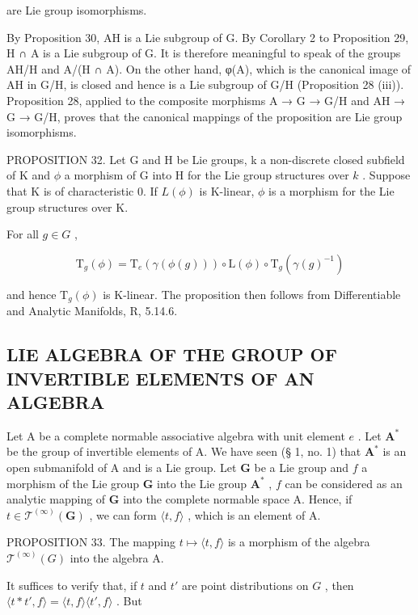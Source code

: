 are Lie group isomorphisms.

By Proposition 30, AH is a Lie subgroup of G. By Corollary 2 to Proposition 29, H ∩ A is a Lie subgroup of G. It is therefore meaningful to speak of the groups AH/H and A/(H ∩ A). On the other hand, φ(A), which is the canonical image of AH in G/H, is closed and hence is a Lie subgroup of G/H (Proposition 28 (iii)). Proposition 28, applied to the composite morphisms A → G → G/H and AH → G → G/H, proves that the canonical mappings of the proposition are Lie group isomorphisms.

PROPOSITION 32. Let G and H be Lie groups, k a non-discrete closed subfield of K and \(\phi\) a morphism of G into H for the Lie group structures over \(k\) . Suppose that K is of characteristic 0. If \(L(\phi)\) is K-linear, \(\phi\) is a morphism for the Lie group structures over K.

For all \(g \in G\) ,

\[
\mathrm{T} _ {g} (\phi) = \mathrm{T} _ {e} (\gamma (\phi (g))) \circ \mathrm{L} (\phi) \circ \mathrm{T} _ {g} (\gamma (g) ^ {- 1})
\]

and hence \(\mathrm{T}_g(\phi)\) is K-linear. The proposition then follows from Differentiable and Analytic Manifolds, R, 5.14.6.

\subsection{LIE ALGEBRA OF THE GROUP OF INVERTIBLE ELEMENTS OF AN ALGEBRA}

Let A be a complete normable associative algebra with unit element \(e\) . Let \(\mathbf{A}^*\) be the group of invertible elements of A. We have seen (§ 1, no. 1) that \(\mathbf{A}^*\) is an open submanifold of A and is a Lie group. Let \(\mathbf{G}\) be a Lie group and \(f\) a morphism of the Lie group \(\mathbf{G}\) into the Lie group \(\mathbf{A}^*\) , \(f\) can be considered as an analytic mapping of \(\mathbf{G}\) into the complete normable space A. Hence, if \(t \in \mathcal{T}^{(\infty)}(\mathbf{G})\) , we can form \(\langle t, f \rangle\) , which is an element of A.

PROPOSITION 33. The mapping \(t \mapsto \langle t, f \rangle\) is a morphism of the algebra \(\mathcal{T}^{(\infty)}(G)\) into the algebra A.

It suffices to verify that, if \(t\) and \(t'\) are point distributions on \(G\) , then \(\langle t * t', f \rangle = \langle t, f \rangle \langle t', f \rangle\) . But


